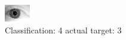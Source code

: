 \begin{figure}[h!]
\begin{center}
\includegraphics[width=0.60\columnwidth]{figures/ID2086_class_4_target_3.png}
\end{center}
\caption{ Classification: 4 actual target: 3}
\label{fig:ID2086_class_4_target_3}
\end{figure}
